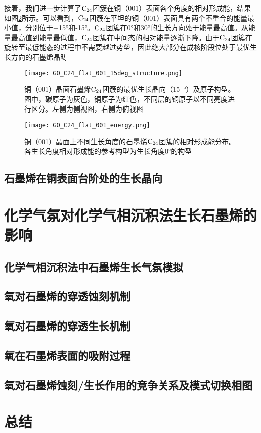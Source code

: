         接着，我们进一步计算了$\rm{C_{24}}$团簇在铜（001）表面各个角度的相对形成能，结果如图\ref{GO_001_energy}所示。可以看到，$\rm{C_{24}}$团簇在平坦的铜（001）表面具有两个不重合的能量最小值，分别位于+15\si{\degree}和-15\si{\degree}。$\rm{C_{24}}$团簇在0\si{\degree}和30\si{\degree}的生长方向处于能量最高值。从能量最高值到能量最低值，$\rm{C_{24}}$团簇在中间态的相对能量逐渐下降。由于$\rm{C_{24}}$团簇在旋转至最低能态的过程中不需要越过势垒，因此绝大部分在成核阶段位处于最优生长方向的石墨烯晶畴


        \begin{figure}[ht]
            \texttt{[image: GO\_C24\_flat\_001\_15deg\_structure.png]}
            \caption{铜（001）晶面石墨烯$\rm{C_{24}}$团簇的最优生长晶向（\SI{15}{\degree}）及原子构型。图中，碳原子为灰色，铜原子为红色，不同层的铜原子以不同亮度进行区分。左侧为侧视图，右侧为俯视图}
            \label{GO_001_15_structure}
        \end{figure}

        \begin{figure}[ht]
            \texttt{[image: GO\_C24\_flat\_001\_energy.png]}
            \caption{铜（001）晶面上不同生长角度的石墨烯$\rm{C_{24}}$团簇的相对形成能分布。各生长角度相对形成能的参考构型为生长角度0\si{\degree}的构型}
            \label{GO_001_energy}
        \end{figure}
    \subsection{石墨烯在铜表面台阶处的生长晶向}
\section{化学气氛对化学气相沉积法生长石墨烯的影响}
\label{sec:石墨烯氧蚀刻穿透}
    \subsection{化学气相沉积法中石墨烯生长气氛模拟}
    \subsection{氧对石墨烯的穿透蚀刻机制}
    \subsection{氧对石墨烯的穿透生长机制}
    \subsection{氧在石墨烯表面的吸附过程}
    \subsection{氧对石墨烯蚀刻/生长作用的竞争关系及模式切换相图}
\section{总结}

